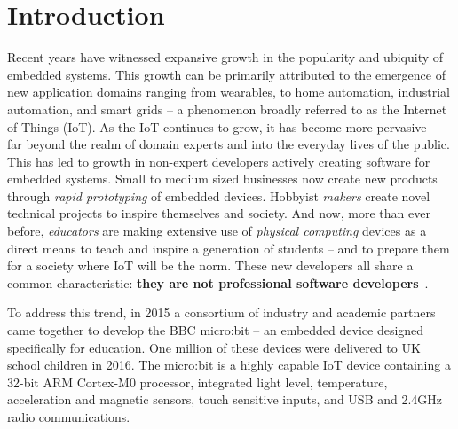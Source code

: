 \section{Introduction}
\label{sec:intro}

Recent years have witnessed expansive growth in the popularity and ubiquity of embedded systems. This growth can be primarily attributed to the emergence of new application domains ranging from wearables, to home automation, industrial automation, and smart grids -- a phenomenon broadly referred to as the Internet of Things (IoT). As the IoT continues to grow, it has become more pervasive -- far beyond the realm of domain experts and into the everyday lives of the public. This has led to growth in non-expert developers actively creating software for embedded systems. Small to medium sized businesses now create new products through \emph{rapid prototyping} of embedded devices. Hobbyist \emph{makers} create novel technical projects to inspire themselves and society. And now, more than ever before, \emph{educators} are making extensive use of \emph{physical computing} devices as a direct means to teach and inspire a generation of students -- and to prepare them for a society where IoT will be the norm. These new developers all share a common characteristic: \textbf{they are not professional software developers}~\cite{dougherty2012maker,bruce2015make,maksimovic2014raspberry}.

To address this trend, in 2015 a consortium of industry and academic partners came together to develop the BBC micro:bit -- an embedded device designed specifically for education. One million of these devices were delivered to UK school children in 2016. The micro:bit is a highly capable IoT device containing a 32-bit ARM Cortex-M0 processor, integrated light level, temperature, acceleration and magnetic sensors, touch sensitive inputs, and USB and 2.4GHz radio communications.

